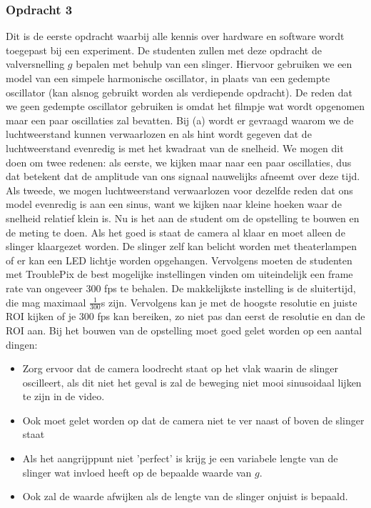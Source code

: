 \documentclass{article}
\begin{document}
\subsubsection{Opdracht 3}
Dit is de eerste opdracht waarbij alle kennis over hardware en software wordt toegepast bij een experiment. De studenten zullen met deze opdracht de valversnelling $g$ bepalen met behulp van een slinger. Hiervoor gebruiken we een model van een simpele harmonische oscillator, in plaats van een gedempte oscillator (kan alsnog gebruikt worden als verdiepende opdracht). De reden dat we geen gedempte oscillator gebruiken is omdat het filmpje wat wordt opgenomen maar een paar oscillaties zal bevatten. Bij (a) wordt er gevraagd waarom we de luchtweerstand kunnen verwaarlozen en als hint wordt gegeven dat de luchtweerstand evenredig is met het kwadraat van de snelheid. We mogen dit doen om twee redenen: als eerste, we kijken maar naar een paar oscillaties, dus dat betekent dat de amplitude van ons signaal nauwelijks afneemt over deze tijd. Als tweede, we mogen luchtweerstand verwaarlozen voor dezelfde reden dat ons model evenredig is aan een sinus, want we kijken naar kleine hoeken waar de snelheid relatief klein is. Nu is het aan de student om de opstelling te bouwen en de meting te doen. Als het goed is staat de camera al klaar en moet alleen de slinger klaargezet worden. De slinger zelf kan belicht worden met theaterlampen of er kan een LED lichtje worden opgehangen. Vervolgens moeten de studenten met TroublePix de best mogelijke instellingen vinden om uiteindelijk een frame rate van ongeveer 300 fps te behalen. De makkelijkste instelling is de sluitertijd, die mag maximaal $\frac{1}{300}$s zijn. Vervolgens kan je met de hoogste resolutie en juiste ROI kijken of je 300 fps kan bereiken, zo niet pas dan eerst de resolutie en dan de ROI aan. Bij het bouwen van de opstelling moet goed gelet worden op een aantal dingen:
\begin{itemize}
    \item Zorg ervoor dat de camera loodrecht staat op het vlak waarin de slinger oscilleert, als dit niet het geval is zal de beweging niet mooi sinusoidaal lijken te zijn in de video.
    \item Ook moet gelet worden op dat de camera niet te ver naast of boven de slinger staat
    \item Als het aangrijppunt niet 'perfect' is krijg je een variabele lengte van de slinger wat invloed heeft op de bepaalde waarde van $g$.
    \item Ook zal de waarde afwijken als de lengte van de slinger onjuist is bepaald.
\end{itemize}
\end{document}
